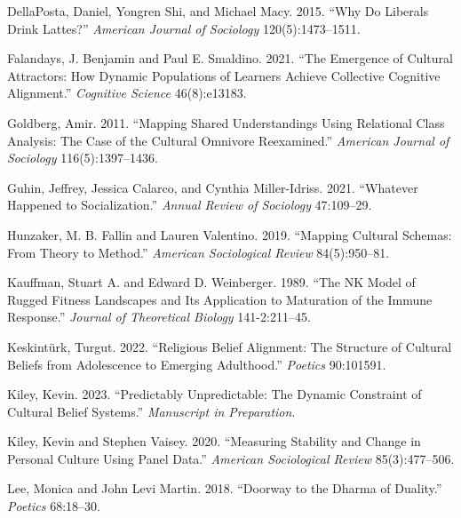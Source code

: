 \documentclass[
  11pt,
]{article}
\newlength{\cslhangindent}
\newlength{\cslentryspacingunit} %
\newenvironment{CSLReferences}[2] %
 {%
  \setlength{\parindent}{0pt}
  \ifodd #1
  \let\oldpar\par
  \def\par{\hangindent=\cslhangindent\oldpar}
  \fi
  \setlength{\parskip}{#2\cslentryspacingunit}
 }%
 {}
\begin{document}
\begin{CSLReferences}{1}{0}
\leavevmode{}%
DellaPosta, Daniel, Yongren Shi, and Michael Macy. 2015. {``Why {Do}
{Liberals} {Drink} {Lattes}?''} \emph{American Journal of Sociology}
120(5):1473--1511.

\leavevmode{}%
Falandays, J. Benjamin and Paul E. Smaldino. 2021. {``The {Emergence} of
{Cultural} {Attractors}: {How} {Dynamic} {Populations} of {Learners}
{Achieve} {Collective} {Cognitive} {Alignment}.''} \emph{Cognitive
Science} 46(8):e13183.

\leavevmode{}%
Goldberg, Amir. 2011. {``Mapping {Shared} {Understandings} {Using}
{Relational} {Class} {Analysis}: {The} {Case} of the {Cultural}
{Omnivore} {Reexamined}.''} \emph{American Journal of Sociology}
116(5):1397--1436.

\leavevmode{}%
Guhin, Jeffrey, Jessica Calarco, and Cynthia Miller-Idriss. 2021.
{``Whatever {Happened} to {Socialization}.''} \emph{Annual Review of
Sociology} 47:109--29.

\leavevmode{}%
Hunzaker, M. B. Fallin and Lauren Valentino. 2019. {``Mapping {Cultural}
{Schemas}: {From} {Theory} to {Method}.''} \emph{American Sociological
Review} 84(5):950--81.

\leavevmode{}%
Kauffman, Stuart A. and Edward D. Weinberger. 1989. {``The NK Model of
Rugged Fitness Landscapes and Its Application to Maturation of the
Immune Response.''} \emph{Journal of Theoretical Biology} 141-2:211--45.

\leavevmode{}%
Keskintürk, Turgut. 2022. {``Religious {Belief} {Alignment}: {The}
{Structure} of {Cultural} {Beliefs} from {Adolescence} to {Emerging}
{Adulthood}.''} \emph{Poetics} 90:101591.

\leavevmode{}%
Kiley, Kevin. 2023. {``Predictably Unpredictable: The Dynamic Constraint
of Cultural Belief Systems.''} \emph{Manuscript in Preparation}.

\leavevmode{}%
Kiley, Kevin and Stephen Vaisey. 2020. {``Measuring {Stability} and
{Change} in {Personal} {Culture} {Using} {Panel} {Data}.''}
\emph{American Sociological Review} 85(3):477--506.

\leavevmode{}%
Lee, Monica and John Levi Martin. 2018. {``Doorway to the {Dharma} of
{Duality}.''} \emph{Poetics} 68:18--30.


\end{CSLReferences}
\end{document}
